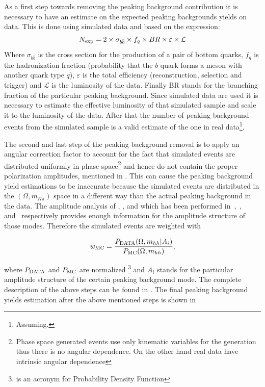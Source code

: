 As a first step towards removing the peaking background contribution it is necessary to have an estimate on the expected
peaking backgrounds yields on data. This is done using simulated data and based on the expression:
\begin{equation}
N_{\rm exp} = 2 \times \sigma_{b\bar{b}}\times f_q \times BR \times \varepsilon \times {\mathcal{L}}
\end{equation}
\noindent Where $\sigma_{b\bar{b}}$ is the cross section for the production of a pair of bottom quarks, $f_q$ is the hadronization fraction
(probability that the $b$ quark forms a meson with another quark type $q$), $\varepsilon$ is the total efficiency (reconstruction, selection and trigger)
and ${\mathcal{L}}$ is the luminosity of the data. Finally BR stands for the branching fraction of the particular peaking background. Since simulated data are used
it is necessary to estimate the effective luminosity of that simulated sample and scale it to the luminosity of the data. After that the number of
peaking background events from the simulated sample is a valid estimate of the one in real 
data\footnote{Assuming.}.

The second and last step of the peaking background removal is to apply an angular correction factor to account for the fact that 
simulated events are distributed uniformly in phase 
space\footnote{Phase space generated events use only kinematic variables for the generation
thus there is no angular dependence. On the other hand real data have intrinsic angular dependence} 
and hence do not contain the proper polarization amplitudes, mentioned in .
This can cause the peaking background yield estimations to be inaccurate because the simulated events are distributed in the $(\Omega, m_{K\pi})$ space
in a different way than the actual peaking background in the data. The amplitude analysis of \BdJpsipipi, \BsJpsipipi, \BsJpsiKK and \LbJpsipK 
which has been performed in~\cite{SheldonBdpipi},~\cite{SheldonBspipi},~\cite{SheldonKK} and~\cite{Gao:1701984} respectively provides enough information
for the amplitude structure of those modes. Therefore the simulated events are weighted with

\begin{equation}
w_{\rm MC} = \frac{P_{\rm DATA} (\Omega, m_{hh}  | {A_i})}{P_{\rm MC}(\Omega, m_{hh})},
\end{equation}

\noindent where $P_{\rm DATA}$ and $P_{\rm MC}$ are normalized \pdfs\footnote{\pdf is an acronym for Probability Density Function} and $A_i$ stands for
the particular amplitude structure of the certain peaking background mode. The complete description of the above steps can be found in \cite{BsJpsiKst_ANA}.
The final peaking background yields estimation after the above mentioned steps is shown in 

